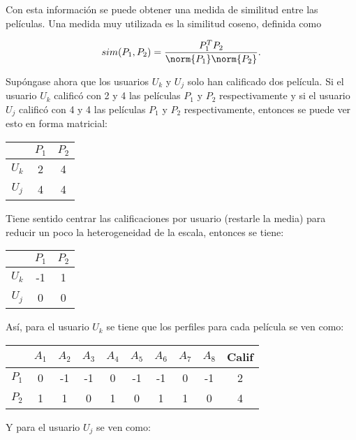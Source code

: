 Con esta información se puede obtener una medida de similitud entre las películas. Una medida muy utilizada es la similitud coseno, definida como

\[
  sim(P_1, P_2) = \frac{P_1^T P_2}{\norm{P_1} \norm{P_2} }.
\]

Supóngase ahora que los usuarios $U_k$ y $U_j$ solo han calificado dos película. Si el usuario $U_k$ calificó con 2 y 4 las películas $P_1$ y $P_2$ respectivamente y si el usuario $U_j$ calificó con 4 y 4 las películas $P_1$ y $P_2$ respectivamente, entonces se puede ver esto en forma matricial:

\begin{center}
  \begin{tabular}{ c | c  c }
      & $P_1$ & $P_2$ \\
    \hline                       
    $U_k$ & 2 & 4 \\
    $U_j$ & 4 & 4 \\
    \hline  
  \end{tabular}
\end{center}

Tiene sentido centrar las calificaciones por usuario (restarle la media) para reducir un poco la heterogeneidad de la escala, entonces se tiene:

\begin{center}
\begin{tabular}{ c | c  c }
    & $P_1$ & $P_2$ \\
  \hline                       
$U_k$ & -1 & 1 \\
$U_j$ & 0 & 0 \\
  \hline  
\end{tabular}
\end{center}

Así, para el usuario $U_k$ se tiene que los perfiles para cada película se ven como:

\begin{center}
\begin{tabular}{ c | c  c c c c c c c c}
    & $A_1$ & $A_2$ & $A_3$ & $A_4$ & $A_5$ & $A_6$ & $A_7$ & $A_8$ & Calif \\
  \hline                       
$P_1$ & 0 & -1 & -1 & 0 & -1 & -1 & 0 & -1 & 2 \\
$P_2$ & 1 & 1 & 0 & 1 & 0 & 1 & 1 & 0 & 4 \\
  \hline  
\end{tabular}
\end{center}

Y para el usuario $U_j$ se ven como:


